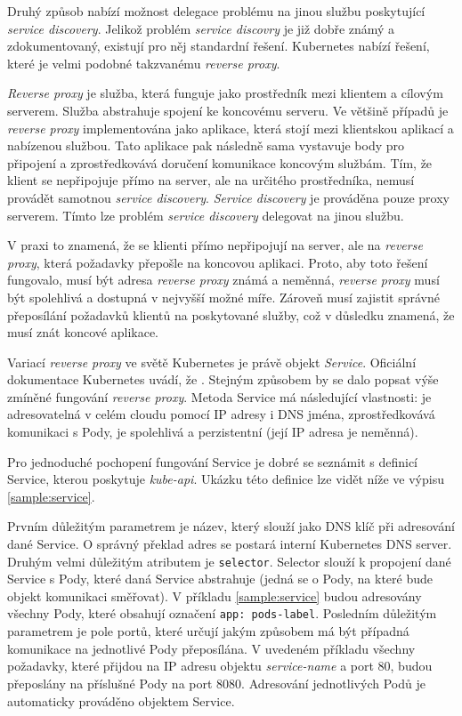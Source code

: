 Druhý způsob nabízí možnost delegace problému na jinou službu poskytující \textit{service discovery}. Jelikož problém \textit{service discovry} je již dobře známý a zdokumentovaný, existují pro něj standardní řešení. Kubernetes nabízí řešení, které je velmi podobné takzvanému \textit{reverse proxy}.


\textit{Reverse proxy} je služba, která funguje jako prostředník mezi klientem a cílovým serverem. Služba abstrahuje spojení ke koncovému serveru. Ve většině případů je \textit{reverse proxy} implementována jako aplikace, která stojí mezi klientskou aplikací a nabízenou službou. Tato aplikace pak následně sama vystavuje body pro připojení a zprostředkovává doručení komunikace koncovým službám. Tím, že klient se nepřipojuje přímo na server, ale na určitého prostředníka, nemusí provádět samotnou \textit{service discovery}. \textit{Service discovery} je prováděna pouze proxy serverem. Tímto lze problém \textit{service discovery} delegovat na jinou službu.

V praxi to znamená, že se klienti přímo nepřipojují na server, ale na \textit{reverse proxy}, která požadavky přepošle na koncovou aplikaci. Proto, aby toto řešení fungovalo, musí být adresa \textit{reverse proxy} známá a neměnná, \textit{reverse proxy} musí být spolehlivá a dostupná v nejvyšší možné míře. Zároveň musí zajistit správné přeposílání požadavků klientů na poskytované služby, což v důsledku znamená, že musí znát koncové aplikace. \cite{nassimkebbani_2022_the}

\bigskip

Variací \textit{reverse proxy} ve světě Kubernetes je právě objekt \textit{Service}. Oficiální dokumentace Kubernetes uvádí, že \textit{} \cite{thekubernetesauthors_2023_service}. Stejným způsobem by se dalo popsat výše zmíněné fungování \textit{reverse proxy}. Metoda Service má následující vlastnosti: je adresovatelná v celém cloudu pomocí IP adresy i DNS jména, zprostředkovává komunikaci s Pody, je spolehlivá a perzistentní (její IP adresa je neměnná).

Pro jednoduché pochopení fungování Service je dobré se seznámit s definicí Service, kterou poskytuje \textit{kube-api}. Ukázku této definice lze vidět níže ve výpisu \ref{sample:service}.


Prvním důležitým parametrem je název, který slouží jako DNS klíč při adresování dané Service. O správný překlad adres se postará interní Kubernetes DNS server. Druhým velmi důležitým atributem je \verb|selector|. Selector slouží k propojení dané Service s Pody, které daná Service abstrahuje (jedná se o Pody, na které bude objekt komunikaci směřovat). V příkladu \ref{sample:service} budou adresovány všechny Pody, které obsahují označení \verb|app: pods-label|. Posledním důležitým parametrem je pole portů, které určují jakým způsobem má být případná komunikace na jednotlivé Pody přeposílána. V uvedeném příkladu všechny požadavky, které přijdou na IP adresu objektu \textit{service-name} a port 80, budou přeposlány na příslušné Pody na port 8080. Adresování jednotlivých Podů je automaticky prováděno objektem Service.

